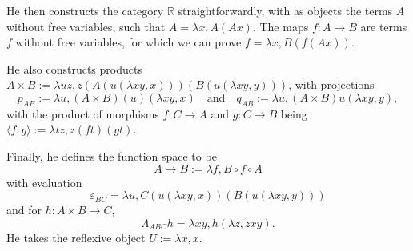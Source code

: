 \documentclass{amsbook}
\theoremstyle{definition}
\begin{document}
  He then constructs the category $ \mathbb R $ straightforwardly, with as objects the terms $ A $ without free variables, such that $ A = \lambda x, A (A x) $. The maps $ f: A \to B $ are terms $ f $ without free variables, for which we can prove $ f = \lambda x, B (f (A x)) $.

  He also constructs products $ A \times B := \lambda u z, z(A(u(\lambda x y, x)))(B(u(\lambda x y, y))) $, with projections
  \[ p_{AB} := \lambda u, (A \times B)(u)(\lambda xy, x) \quad \text{and} \quad q_{AB} := \lambda u, (A \times B) u (\lambda xy, y), \]
  with the product of morphisms $ f: C \to A $ and $ g: C \to B $ being $ \langle f, g \rangle := \lambda t z, z(f t)(g t) $.

  Finally, he defines the function space to be
  \[ A \to B := \lambda f, B \circ f \circ A \]
  with evaluation
  \[ \varepsilon_{BC} = \lambda u, C(u(\lambda x y, x))(B(u(\lambda x y, y))) \]
  and for $ h: A \times B \to C $,
  \[ \Lambda_{ABC} h = \lambda x y, h (\lambda z, z x y). \]
  He takes the reflexive object $ U := \lambda x, x $.

  
  
\end{document}
